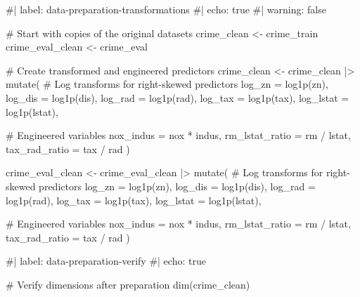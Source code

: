 \documentclass[
  11pt]{article}
\newenvironment{Shaded}{\begin{snugshade}}{\end{snugshade}}
\newcommand{\AttributeTok}[1]{\textcolor[rgb]{0.40,0.45,0.13}{#1}}
\newcommand{\CommentTok}[1]{\textcolor[rgb]{0.37,0.37,0.37}{#1}}
\newcommand{\FunctionTok}[1]{\textcolor[rgb]{0.28,0.35,0.67}{#1}}
\newcommand{\NormalTok}[1]{\textcolor[rgb]{0.00,0.23,0.31}{#1}}
\newcommand{\OtherTok}[1]{\textcolor[rgb]{0.00,0.23,0.31}{#1}}
\newcommand{\SpecialCharTok}[1]{\textcolor[rgb]{0.37,0.37,0.37}{#1}}
\begin{document}
\begin{Shaded}
\begin{Highlighting}[]
\CommentTok{\#| label: data{-}preparation{-}transformations}
\CommentTok{\#| echo: true}
\CommentTok{\#| warning: false}

\CommentTok{\# Start with copies of the original datasets}
\NormalTok{crime\_clean }\OtherTok{\textless{}{-}}\NormalTok{ crime\_train}
\NormalTok{crime\_eval\_clean }\OtherTok{\textless{}{-}}\NormalTok{ crime\_eval}

\CommentTok{\# Create transformed and engineered predictors}
\NormalTok{crime\_clean }\OtherTok{\textless{}{-}}\NormalTok{ crime\_clean }\SpecialCharTok{|\textgreater{}}
  \FunctionTok{mutate}\NormalTok{(}
    \CommentTok{\# Log transforms for right{-}skewed predictors}
    \AttributeTok{log\_zn    =} \FunctionTok{log1p}\NormalTok{(zn),}
    \AttributeTok{log\_dis   =} \FunctionTok{log1p}\NormalTok{(dis),}
    \AttributeTok{log\_rad   =} \FunctionTok{log1p}\NormalTok{(rad),}
    \AttributeTok{log\_tax   =} \FunctionTok{log1p}\NormalTok{(tax),}
    \AttributeTok{log\_lstat =} \FunctionTok{log1p}\NormalTok{(lstat),}

    \CommentTok{\# Engineered variables}
    \AttributeTok{nox\_indus     =}\NormalTok{ nox }\SpecialCharTok{*}\NormalTok{ indus,}
    \AttributeTok{rm\_lstat\_ratio =}\NormalTok{ rm }\SpecialCharTok{/}\NormalTok{ lstat,}
    \AttributeTok{tax\_rad\_ratio  =}\NormalTok{ tax }\SpecialCharTok{/}\NormalTok{ rad}
\NormalTok{  )}

\NormalTok{crime\_eval\_clean }\OtherTok{\textless{}{-}}\NormalTok{ crime\_eval\_clean }\SpecialCharTok{|\textgreater{}}
  \FunctionTok{mutate}\NormalTok{(}
    \CommentTok{\# Log transforms for right{-}skewed predictors}
    \AttributeTok{log\_zn    =} \FunctionTok{log1p}\NormalTok{(zn),}
    \AttributeTok{log\_dis   =} \FunctionTok{log1p}\NormalTok{(dis),}
    \AttributeTok{log\_rad   =} \FunctionTok{log1p}\NormalTok{(rad),}
    \AttributeTok{log\_tax   =} \FunctionTok{log1p}\NormalTok{(tax),}
    \AttributeTok{log\_lstat =} \FunctionTok{log1p}\NormalTok{(lstat),}

    \CommentTok{\# Engineered variables}
    \AttributeTok{nox\_indus     =}\NormalTok{ nox }\SpecialCharTok{*}\NormalTok{ indus,}
    \AttributeTok{rm\_lstat\_ratio =}\NormalTok{ rm }\SpecialCharTok{/}\NormalTok{ lstat,}
    \AttributeTok{tax\_rad\_ratio  =}\NormalTok{ tax }\SpecialCharTok{/}\NormalTok{ rad}
\NormalTok{  )}

\CommentTok{\#| label: data{-}preparation{-}verify}
\CommentTok{\#| echo: true}

\CommentTok{\# Verify dimensions after preparation}
\FunctionTok{dim}\NormalTok{(crime\_clean)}
\end{Highlighting}
\end{Shaded}
\end{document}
